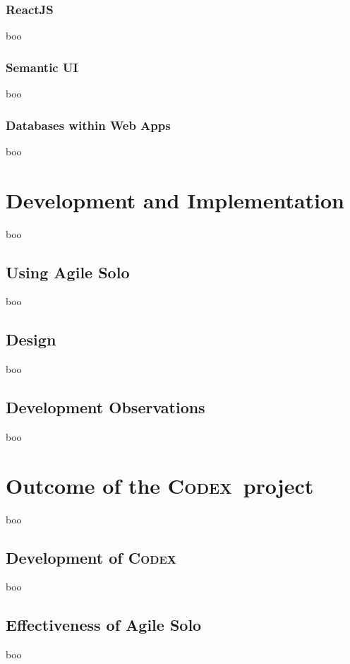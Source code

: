 \documentclass[final]{cmpreport}
\newcommand{\Codex}{\textsc{Codex}}
\begin{document}
			\subsubsection{ReactJS} \label{sec:react-js}
			boo
			
			\subsubsection{Semantic UI} \label{sec:semantic-ui}
			boo
			
			\subsubsection{Databases within Web Apps} \label{sec:databases}
			boo
			
	\section{Development and Implementation} \label{sec:dev-and-imp}
	boo
	
		\subsection{Using Agile Solo} \label{sec:use-agile-solo}
		boo
			
		\subsection{Design} \label{sec:design}
		boo
		
		\subsection{Development Observations} \label{sec:dev-obs}
		boo
		
	\section{Outcome of the \Codex \ project} \label{sec:outcomes}
	boo
	
		\subsection{Development of \Codex} \label{sec:codex-development}
		boo
			
		\subsection{Effectiveness of Agile Solo} \label{sec:agile-solo-effect}
		boo	
		
\end{document}
